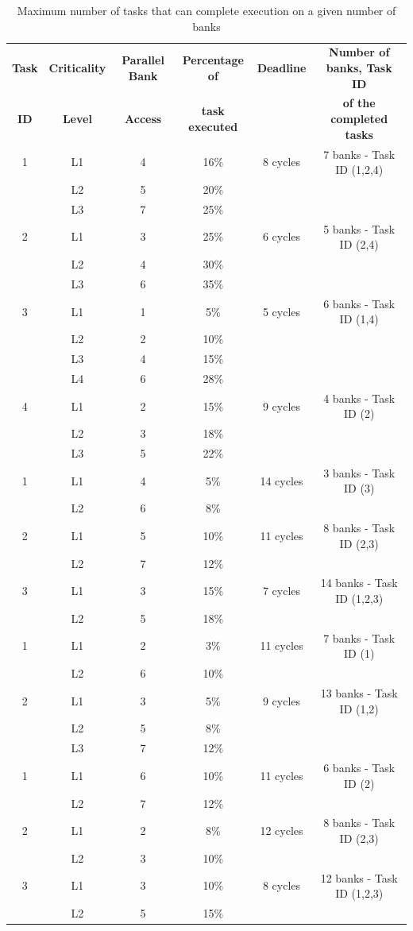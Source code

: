  \begin{table}[!htb]
 {\centering
 \begin{tabular}{|c|c|c|c|c|c|}\hline
 {\bf Task} & {\bf Criticality} & {\bf Parallel Bank}  & {\bf Percentage of} & {\bf Deadline} & {\bf Number of banks, Task ID}  \\
 {\bf ID}  & {\bf Level} & {\bf Access} & {\bf task executed} & &  {\bf of the completed tasks}   \\ \hline
 1 & L1 & 4 & 16\% & 8 cycles & 7 banks - Task ID (1,2,4) \\
   & L2 & 5 & 20\% &          &  \\
   & L3 & 7 & 25\% &          &   \\ 
 2 & L1 & 3 & 25\% & 6 cycles & 5 banks - Task ID (2,4)   \\
   & L2 & 4 & 30\% &          &     \\
   & L3 & 6 & 35\% &          &      \\ 
 3 & L1 & 1 & 5\% & 5 cycles &  6 banks - Task ID (1,4)   \\
   & L2 & 2 & 10\% &         &      \\
   & L3 & 4 & 15\% &         &      \\
   & L4 & 6 & 28\% &         &       \\
 4 & L1 & 2 & 15\% & 9 cycles & 4 banks - Task ID (2)\\
   & L2 & 3 & 18\% &          & \\
   & L3 & 5 & 22\% &          & \\ \hline   
 1 & L1 & 4 & 5\% & 14 cycles & 3 banks - Task ID (3)\\
   & L2 & 6 & 8\% &           & \\
 2 & L1 & 5 & 10\% & 11 cycles & 8 banks - Task ID (2,3)\\
   & L2 & 7 & 12\% &          & \\
 3 & L1 & 3 & 15\% & 7 cycles & 14 banks - Task ID (1,2,3)\\
   & L2 & 5 & 18\% &          & \\ \hline
 1 & L1 & 2 & 3\% & 11 cycles & 7 banks - Task ID (1)\\
   & L2 & 6 & 10\% &          & \\
 2 & L1 & 3 & 5\% & 9 cycles & 13 banks - Task ID (1,2) \\
   & L2 & 5 & 8\% &          & \\
   & L3 & 7 & 12\% &         & \\ \hline
 1 & L1 & 6 & 10\% & 11 cycles & 6 banks - Task ID (2) \\
   & L2 & 7 & 12\% &           & \\
 2 & L1 & 2 & 8\% & 12 cycles & 8 banks - Task ID (2,3) \\
   & L2 & 3 & 10\% &          & \\
 3 & L1 & 3 & 10\% & 8 cycles & 12 banks - Task ID (1,2,3) \\
   & L2 & 5 & 15\% &          & \\ \hline
 \end{tabular}
 }
 \caption{Maximum number of tasks that can complete execution on a given number of banks}
 \label{tab3}
 \end{table}
 
